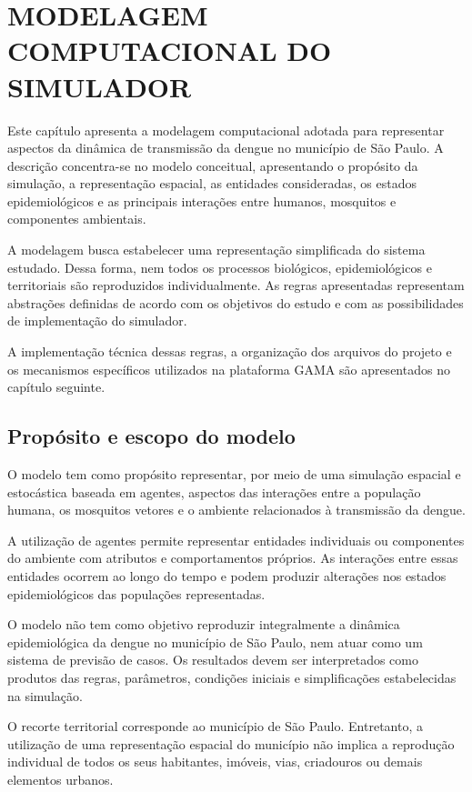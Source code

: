 \chapter{MODELAGEM COMPUTACIONAL DO SIMULADOR}

Este capítulo apresenta a modelagem computacional adotada para representar aspectos da dinâmica de transmissão da dengue no município de São Paulo. A descrição concentra-se no modelo conceitual, apresentando o propósito da simulação, a representação espacial, as entidades consideradas, os estados epidemiológicos e as principais interações entre humanos, mosquitos e componentes ambientais.

A modelagem busca estabelecer uma representação simplificada do sistema estudado. Dessa forma, nem todos os processos biológicos, epidemiológicos e territoriais são reproduzidos individualmente. As regras apresentadas representam abstrações definidas de acordo com os objetivos do estudo e com as possibilidades de implementação do simulador.

A implementação técnica dessas regras, a organização dos arquivos do projeto e os mecanismos específicos utilizados na plataforma GAMA são apresentados no capítulo seguinte.

\section{Propósito e escopo do modelo}

O modelo tem como propósito representar, por meio de uma simulação espacial e estocástica baseada em agentes, aspectos das interações entre a população humana, os mosquitos vetores e o ambiente relacionados à transmissão da dengue.

A utilização de agentes permite representar entidades individuais ou componentes do ambiente com atributos e comportamentos próprios. As interações entre essas entidades ocorrem ao longo do tempo e podem produzir alterações nos estados epidemiológicos das populações representadas.

O modelo não tem como objetivo reproduzir integralmente a dinâmica epidemiológica da dengue no município de São Paulo, nem atuar como um sistema de previsão de casos. Os resultados devem ser interpretados como produtos das regras, parâmetros, condições iniciais e simplificações estabelecidas na simulação.

O recorte territorial corresponde ao município de São Paulo. Entretanto, a utilização de uma representação espacial do município não implica a reprodução individual de todos os seus habitantes, imóveis, vias, criadouros ou demais elementos urbanos.

